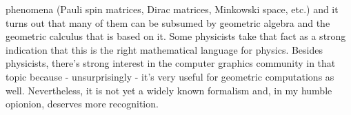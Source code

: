 phenomena (Pauli spin matrices, Dirac matrices, Minkowski space, etc.) and it turns out that many of them can be subsumed by geometric algebra and the geometric calculus that is based on it. Some physicists take that fact as a strong indication that this is the right mathematical language for physics. Besides physicists, there's strong interest in the computer graphics community in that topic because - unsurprisingly - it's very useful for geometric computations as well. Nevertheless, it is not yet a widely known formalism and, in my humble opionion, deserves more recognition.





\begin{comment}


Notation for geometric algebras: $\mathbb{G}^{i,j,k}$ where i is the number of basis vectors that square to 1, j the number of basis vectors that square to -1 and k the number of basis vectors that square to zero (verify!). The triple $i,j,k$ is called the signature of the algebra.

Example algebras:
-G(0,0,0): real numbers
-G(1,0,0): hyperbolic numbers
-G(0,1,0): complex numbers
-G(0,0,1): dual numbers
-G(2,0,0): 2D Euclidean space
-G(3,0,0): 3D Euclidean space
-G(3,1,0): Minkowski spacetime (somtimes also G(1,3,0) is used - a matter of convention)

-the complex numbers or versions of it with a non-commuting imaginary unit appear in various sub-algebras of higher-dimensional gemoetric algebras, for example in G(2,0,0) and G(3,0,0)

ToDo: mention generalizations with arbitrary metric tensors


https://www.youtube.com/watch?v=htYh-Tq7ZBI  Why can't you multiply vectors? [Dutch Game Day, 2023] 
40:29 Generalized curvature of a curve: \kappa = (f' \wedge f'') / |f'|^3
 -> For geometric calculus

Geometric algebra takes all the different objects from exterior algebra and throws them together 
into a single pot.

\end{comment}